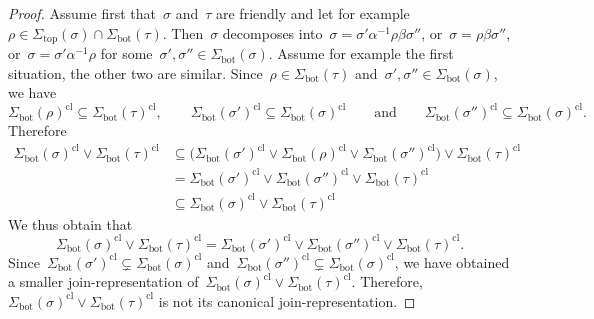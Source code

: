 \documentclass{amsart}
\theoremstyle{definition}
\renewcommand{\top}{\mathrm{top}} %
\newcommand{\bottom}{\mathrm{bot}} %
\newcommand{\join}{\vee} %
\newcommand{\closure}[1]{#1^{\mathrm{cl}}} %
\begin{document}
\begin{proof}
Assume first that~$\sigma$ and~$\tau$ are friendly and let for example~$\rho \in \Sigma_\top(\sigma) \cap \Sigma_\bottom(\tau)$.
Then~$\sigma$ decomposes into~$\sigma = \sigma' \alpha^{-1} \rho \beta \sigma''$, or~$\sigma = \rho \beta \sigma''$, or~$\sigma = \sigma' \alpha^{-1} \rho$ for some~$\sigma', \sigma'' \in \Sigma_\bottom(\sigma)$.
Assume for example the first situation, the other two are similar.
Since~$\rho \in \Sigma_\bottom(\tau)$ and~$\sigma', \sigma'' \in \Sigma_\bottom(\sigma)$, we have
\[
\closure{\Sigma_\bottom(\rho)} \subseteq \closure{\Sigma_\bottom(\tau)},
\qquad
\closure{\Sigma_\bottom(\sigma')} \subseteq \closure{\Sigma_\bottom(\sigma)}
\qquad\text{and}\qquad
\closure{\Sigma_\bottom(\sigma'')} \subseteq \closure{\Sigma_\bottom(\sigma)}.
\]
Therefore
\begin{align*}
\closure{\Sigma_\bottom(\sigma)} \join \closure{\Sigma_\bottom(\tau)}
& \subseteq \big( \closure{\Sigma_\bottom(\sigma')} \join \closure{\Sigma_\bottom(\rho)} \join \closure{\Sigma_\bottom(\sigma'')} \big) \join \closure{\Sigma_\bottom(\tau)} \\
& = \closure{\Sigma_\bottom(\sigma')} \join \closure{\Sigma_\bottom(\sigma'')} \join \closure{\Sigma_\bottom(\tau)} \\
& \subseteq \closure{\Sigma_\bottom(\sigma)} \join \closure{\Sigma_\bottom(\tau)}
\end{align*}
We thus obtain that
\[
\closure{\Sigma_\bottom(\sigma)} \join \closure{\Sigma_\bottom(\tau)} = \closure{\Sigma_\bottom(\sigma')} \join \closure{\Sigma_\bottom(\sigma'')} \join \closure{\Sigma_\bottom(\tau)}.
\]
Since~$\closure{\Sigma_\bottom(\sigma')} \subsetneq \closure{\Sigma_\bottom(\sigma)}$ and~$\closure{\Sigma_\bottom(\sigma'')} \subsetneq \closure{\Sigma_\bottom(\sigma)}$, we have obtained a smaller join-represen\-tation of~$\closure{\Sigma_\bottom(\sigma)} \join \closure{\Sigma_\bottom(\tau)}$. Therefore,~$\closure{\Sigma_\bottom(\sigma)} \join \closure{\Sigma_\bottom(\tau)}$ is not its canonical join-representation.


\end{proof}
\end{document}

